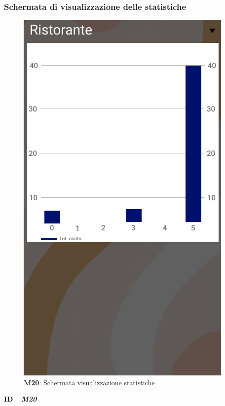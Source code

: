                     \subsubsection{Schermata di visualizzazione delle statistiche}
                      \begin{figure}[H]
                        \centering
                        \includegraphics[scale=0.5]{assets/diagrammi/Mockup/Mockup_Statistics.png}
                        \caption*{\textbf{M20}: Schermata visualizzazione statistiche}\label{fig:Mockup_Statistics}
                      \end{figure}

                      \begin{flushleft}
                        \textbf{ID}   \ \Large{ \emph{\textbf{M20}}}
                      \end{flushleft}

